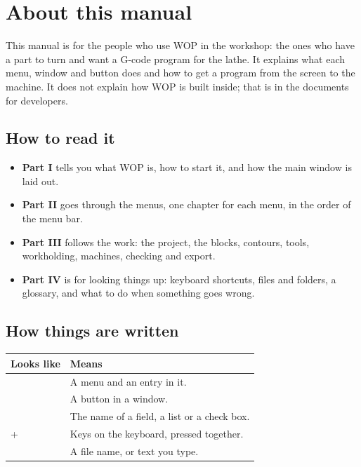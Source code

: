 \chapter*{About this manual}

This manual is for the people who use WOP in the workshop: the ones who have a part to turn and want a G-code program for the lathe. It explains what each menu, window and button does and how to get a program from the screen to the machine. It does not explain how WOP is built inside; that is in the documents for developers.

\section*{How to read it}
\begin{itemize}
  \item \textbf{Part I} tells you what WOP is, how to start it, and how the main window is laid out.
  \item \textbf{Part II} goes through the menus, one chapter for each menu, in the order of the menu bar.
  \item \textbf{Part III} follows the work: the project, the blocks, contours, tools, workholding, machines, checking and export.
  \item \textbf{Part IV} is for looking things up: keyboard shortcuts, files and folders, a glossary, and what to do when something goes wrong.
\end{itemize}

\section*{How things are written}
\begin{center}
\begin{tabularx}{0.9\textwidth}{@{}l Y@{}}
\toprule
\textbf{Looks like} & \textbf{Means} \\
\midrule
{} & A menu and an entry in it. \\
 & A button in a window. \\
 & The name of a field, a list or a check box. \\
+ & Keys on the keyboard, pressed together. \\
 & A file name, or text you type. \\
\bottomrule
\end{tabularx}
\end{center}

